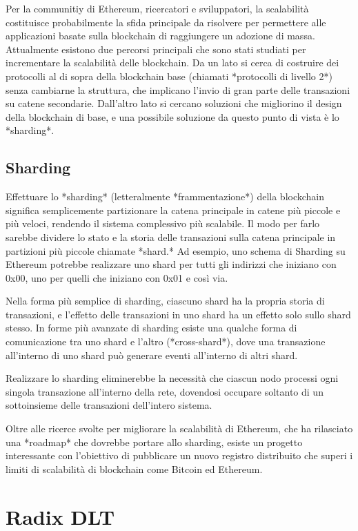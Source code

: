 Per la communitiy di Ethereum, ricercatori e sviluppatori, la scalabilità costituisce probabilmente la sfida principale da risolvere per permettere alle applicazioni basate sulla blockchain di raggiungere un adozione di massa. Attualmente esistono due percorsi principali che sono stati studiati per incrementare la scalabilità delle blockchain. Da un lato si cerca di costruire dei protocolli al di sopra della blockchain base (chiamati *protocolli di livello 2*) senza cambiarne la struttura, che implicano l'invio di gran parte delle transazioni su catene secondarie. Dall'altro lato si cercano soluzioni che migliorino il design della blockchain di base, e una possibile soluzione da questo punto di vista è lo *sharding*.

\subsection{Sharding}

Effettuare lo *sharding* (letteralmente *frammentazione*) della blockchain significa semplicemente partizionare la catena principale in catene più piccole e più veloci, rendendo il sistema complessivo più scalabile. Il modo per farlo sarebbe dividere lo stato e la storia delle transazioni sulla catena principale in partizioni più piccole chiamate *shard.* Ad esempio, uno schema di Sharding su Ethereum potrebbe realizzare uno shard per tutti gli indirizzi che iniziano con 0x00, uno per quelli che iniziano con 0x01 e così via. 

Nella forma più semplice di sharding, ciascuno shard ha la propria storia di transazioni, e l'effetto delle transazioni in uno shard ha un effetto solo sullo shard stesso. In forme più avanzate di sharding esiste una qualche forma di comunicazione tra uno shard e l'altro (*cross-shard*), dove una transazione all'interno di uno shard può generare eventi all'interno di altri shard.

Realizzare lo sharding eliminerebbe la necessità che ciascun nodo processi ogni singola transazione all'interno della rete, dovendosi occupare soltanto di un sottoinsieme delle transazioni dell'intero sistema.

Oltre alle ricerce svolte per migliorare la scalabilità di Ethereum, che ha rilasciato una *roadmap* che dovrebbe portare allo sharding, esiste un progetto interessante con l'obiettivo di pubblicare un nuovo registro distribuito che superi i limiti di scalabilità di blockchain come Bitcoin ed Ethereum.

\section{Radix DLT}

